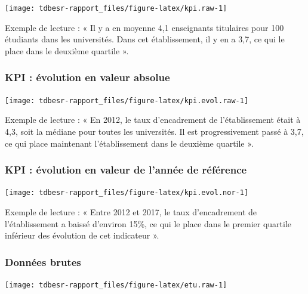\documentclass[12pt,french,landscape]{article}
\begin{document}
\begin{multicols}{2}
\begin{center}\texttt{[image: tdbesr-rapport\_files/figure-latex/kpi.raw-1]} \end{center}

Exemple de lecture : « Il y a en moyenne 4,1 enseignants titulaires pour
100 étudiants dans les universités. Dans cet établissement, il y en a
3,7, ce qui le place dans le deuxième quartile ».

\hypertarget{kpi-uxe9volution-en-valeur-absolue}{%
\subsubsection{KPI : évolution en valeur
absolue}\label{kpi-uxe9volution-en-valeur-absolue}}

\begin{center}\texttt{[image: tdbesr-rapport\_files/figure-latex/kpi.evol.raw-1]} \end{center}

Exemple de lecture : « En 2012, le taux d'encadrement de l'établissement
était à 4,3, soit la médiane pour toutes les universités. Il est
progressivement passé à 3,7, ce qui place maintenant l'établissement
dans le deuxième quartile ».

\hypertarget{kpi-uxe9volution-en-valeur-de-lannuxe9e-de-ruxe9fuxe9rence}{%
\subsubsection{KPI : évolution en valeur de l'année de
référence}\label{kpi-uxe9volution-en-valeur-de-lannuxe9e-de-ruxe9fuxe9rence}}

\begin{center}\texttt{[image: tdbesr-rapport\_files/figure-latex/kpi.evol.nor-1]} \end{center}

Exemple de lecture : « Entre 2012 et 2017, le taux d'encadrement de
l'établissement a baissé d'environ 15\%, ce qui le place dans le premier
quartile inférieur des évolution de cet indicateur ».

\hypertarget{donnuxe9es-brutes}{%
\subsubsection{Données brutes}\label{donnuxe9es-brutes}}

\begin{center}\texttt{[image: tdbesr-rapport\_files/figure-latex/etu.raw-1]} \end{center}


\end{multicols}
\end{document}
